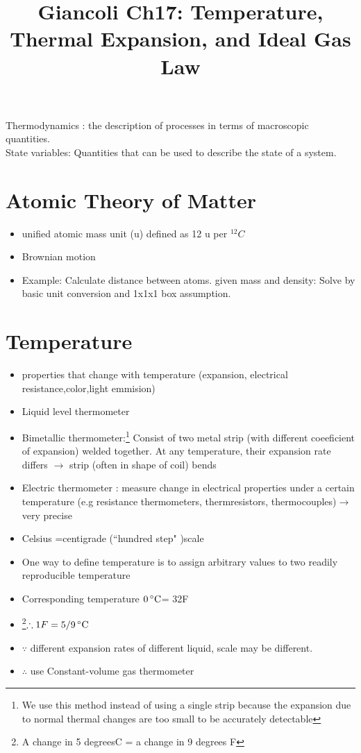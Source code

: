 \documentclass[12 pt , twoside, letterpaper] {article}
\begin{document}
\title{Giancoli Ch17: \normalsize Temperature, Thermal Expansion, and Ideal Gas Law}
\date{}
\maketitle
\vspace{-50pt}
Thermodynamics : the description of processes in terms of macroscopic quantities.
\\ State variables: Quantities that can be used to describe the state of a system.
\section{Atomic Theory of Matter}
\begin{itemize}
\item unified atomic mass unit (u) defined as 12 u per $^{12}C$
 \item Brownian motion
 \item Example: Calculate distance between atoms. given mass and density: Solve by basic unit conversion and 1x1x1 box assumption.
 \end{itemize}
 \section{Temperature}
 \begin{itemize}
 \item properties that change with temperature (expansion, electrical resistance,color,light emmision)
 \item Liquid level thermometer
 \item Bimetallic thermometer:\footnote{We use this method instead of using a single strip because the expansion due to normal thermal changes are too small to be accurately detectable}
 Consist of two metal strip (with different coeeficient of expansion) welded together. At any temperature, their expansion rate differs $\rightarrow$ strip (often in shape of coil) bends
 \item Electric thermometer : measure change in electrical properties under a certain temperature (e.g resistance thermometers, thermresistors, thermocouples)$\rightarrow$ very precise
 \item Celsius =centigrade (``hundred step" )scale 
 \item One way to define temperature is to assign arbitrary values to two readily reproducible temperature
 \item Corresponding temperature $0\,^{\circ}{\rm C} $= 32F 
 \item \footnote{A change in 5 degreesC = a change in 9 degrees F}$\therefore 1F=5/9\,^{\circ}{\rm C}$
 \item $\because$ different expansion rates of different liquid, scale may be different.
\item $\therefore$ use Constant-volume gas thermometer 
 \end{itemize}
\end{document}
